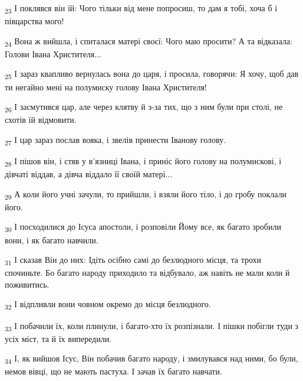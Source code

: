\begin{tcolorbox}
\textsubscript{23} І поклявся він їй: Чого тільки від мене попросиш, то дам я тобі, хоча б і півцарства мого!
\end{tcolorbox}
\begin{tcolorbox}
\textsubscript{24} Вона ж вийшла, і спиталася матері своєї: Чого маю просити? А та відказала: Голови Івана Христителя...
\end{tcolorbox}
\begin{tcolorbox}
\textsubscript{25} І зараз квапливо вернулась вона до царя, і просила, говорячи: Я хочу, щоб дав ти негайно мені на полумиску голову Івана Христителя!
\end{tcolorbox}
\begin{tcolorbox}
\textsubscript{26} І засмутився цар, але через клятву й з-за тих, що з ним були при столі, не схотів їй відмовити.
\end{tcolorbox}
\begin{tcolorbox}
\textsubscript{27} І цар зараз послав вояка, і звелів принести Іванову голову.
\end{tcolorbox}
\begin{tcolorbox}
\textsubscript{28} І пішов він, і стяв у в'язниці Івана, і приніс його голову на полумискові, і дівчаті віддав, а дівча віддало її своїй матері...
\end{tcolorbox}
\begin{tcolorbox}
\textsubscript{29} А коли його учні зачули, то прийшли, і взяли його тіло, і до гробу поклали його.
\end{tcolorbox}
\begin{tcolorbox}
\textsubscript{30} І посходилися до Ісуса апостоли, і розповіли Йому все, як багато зробили вони, і як багато навчили.
\end{tcolorbox}
\begin{tcolorbox}
\textsubscript{31} І сказав Він до них: Ідіть осібно самі до безлюдного місця, та трохи спочиньте. Бо багато народу приходило та відбувало, аж навіть не мали коли й поживитись.
\end{tcolorbox}
\begin{tcolorbox}
\textsubscript{32} І відпливли вони човном окремо до місця безлюдного.
\end{tcolorbox}
\begin{tcolorbox}
\textsubscript{33} І побачили їх, коли плинули, і багато-хто їх розпізнали. І пішки побігли туди з усіх міст, та й їх випередили.
\end{tcolorbox}
\begin{tcolorbox}
\textsubscript{34} І, як вийшов Ісус, Він побачив багато народу, і змилувався над ними, бо були, немов вівці, що не мають пастуха. І зачав їх багато навчати.
\end{tcolorbox}
